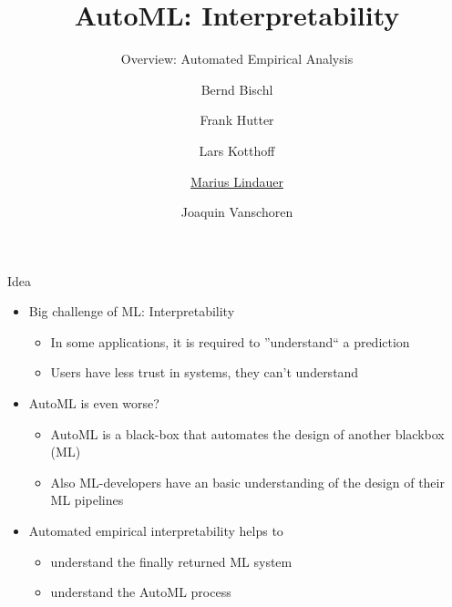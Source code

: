 


\title[AutoML: Interpretability]{AutoML: Interpretability}
\subtitle{Overview: Automated Empirical Analysis}
\author[Marius Lindauer]{Bernd Bischl \and Frank Hutter \and Lars Kotthoff\newline \and \underline{Marius Lindauer} \and Joaquin Vanschoren}
\institute{}
\date{}





	
	\maketitle
	

\begin{frame}[c]{Idea}


\begin{itemize}
	\item Big challenge of ML: Interpretability
	\begin{itemize}
		\item In some applications, it is required to ''understand`` a prediction 
		\item Users have less trust in systems, they can't understand
	\end{itemize}

	\bigskip
	\pause
	\item AutoML is even worse?
	\begin{itemize}
		\item AutoML  is a black-box that automates the design  of another blackbox (ML)
		\item Also ML-developers have an basic understanding of the design of their ML pipelines
	\end{itemize}

	\bigskip
	\item Automated empirical interpretability helps to
	\begin{itemize}
		\item understand the finally returned ML system
		\item understand the AutoML process
	\end{itemize}

\end{itemize}

\end{frame}

